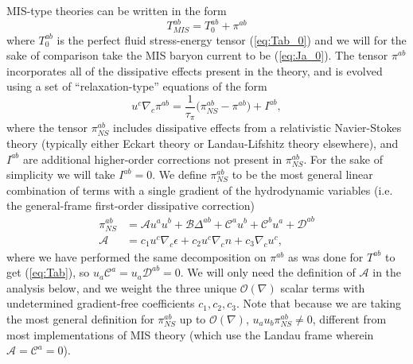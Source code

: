 \documentclass[%
notitlepage,
superscriptaddress,
nofootinbib,
amsmath,
amssymb,
aps,
twocolumn
]{revtex4-1}
\begin{document}
MIS-type theories can be written in the form
\begin{equation}
T^{ab}_{MIS} = T^{ab}_{0} + \pi^{ab}
\end{equation}
where $T^{ab}_{0}$ is the perfect fluid stress-energy tensor
(\ref{eq:Tab_0}) and we will for the sake of comparison take the MIS baryon
current to be (\ref{eq:Ja_0}).  The tensor $\pi^{ab}$ incorporates all of
the dissipative effects present in the theory, and is evolved using a set
of ``relaxation-type'' equations of the form
\begin{equation} \label{eq:MIS_relax}
u^{c} \nabla_{c} \pi^{ab} = \frac{1}{\tau_{\pi}} \big( \pi^{ab}_{NS} - \pi^{ab} \big) + I^{ab},
\end{equation}
where the tensor $\pi^{ab}_{NS}$ includes dissipative effects from a
relativistic Navier-Stokes theory (typically either Eckart theory or Landau-Lifshitz theory elsewhere), and $I^{ab}$ are
additional higher-order corrections not present in $\pi^{ab}_{NS}$.  For the
sake of simplicity we will take $I^{ab} = 0$. 
We define $\pi^{ab}_{NS}$ to be the most general linear combination of terms with a single gradient of the hydrodynamic variables (i.e. the general-frame first-order dissipative correction)
\begin{equation}
\begin{aligned}
\pi^{ab}_{NS} &= \mathcal{A} u^{a} u^{b} + \mathcal{B} \Delta^{ab} + \mathcal{C}^{a} u^{b} + \mathcal{C}^{b} u^{a} + \mathcal{D}^{ab} \\
\mathcal{A} &= c_1 u^{c} \nabla_{c} \epsilon + c_2 u^{c} \nabla_{c} n + c_3 \nabla_{c} u^{c},
\end{aligned}
\end{equation}
where we have performed the same decomposition on $\pi^{ab}$ as was done for $T^{ab}$ to get (\ref{eq:Tab}), so $u_{a} \mathcal{C}^{a} = u_{a} \mathcal{D}^{ab} = 0$.  We will only need the definition of $\mathcal{A}$ in the analysis below, and we weight the three unique $\mathcal{O}(\nabla)$ scalar terms with undetermined gradient-free coefficients $c_1, c_2, c_3$.  Note that because we are taking the most general definition for $\pi^{ab}_{NS}$ up to $\mathcal{O}(\nabla)$, $u_{a} u_{b} \pi^{ab}_{NS} \neq 0$, different from most implementations of MIS theory (which use the Landau frame wherein $\mathcal{A} = \mathcal{C}^{a} = 0$).
\end{document}
